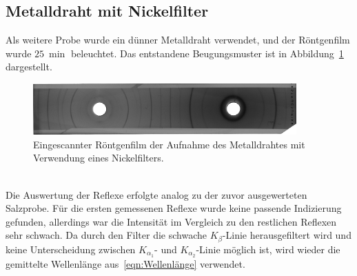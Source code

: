 \documentclass[a4paper,twoside,final]{article}
\begin{document}
\subsection{Metalldraht mit Nickelfilter}
Als weitere Probe wurde ein dünner Metalldraht verwendet, und der Röntgenfilm wurde $\SI{25}{\min}$ beleuchtet. Das entstandene Beugungsmuster ist in Abbildung~\ref{fig:Metalldraht} dargestellt.
\begin{figure}[htp]
    \centering
        \includegraphics[width=0.9\textwidth]{Abbildungen/Roentgenfilm_Metalldraht_Filter.jpg}
    \caption{Eingescannter Röntgenfilm der Aufnahme des Metalldrahtes mit Verwendung eines Nickelfilters.}
    \label{fig:Metalldraht}
\end{figure}\\
Die Auswertung der Reflexe erfolgte analog zu der zuvor ausgewerteten Salzprobe. Für die ersten gemessenen Reflexe wurde keine passende Indizierung gefunden, allerdings war die Intensität im Vergleich zu den restlichen Reflexen sehr schwach. Da durch den Filter die schwache $K_\beta$-Linie herausgefiltert wird und keine Unterscheidung zwischen $K_{\alpha_1}$- und $K_{\alpha_2}$-Linie möglich ist, wird wieder die gemittelte Wellenlänge aus~\eqref{eqn:Wellenlänge} verwendet.
\end{document}
